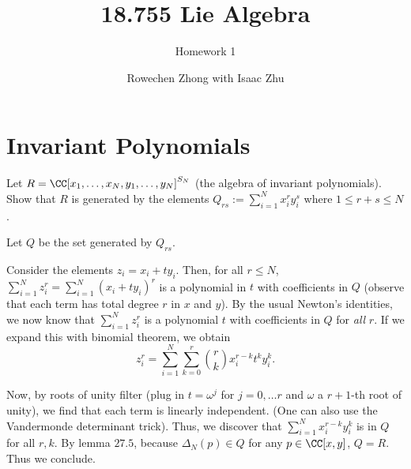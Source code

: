\documentclass[11pt, headheight=30pt]{scrartcl}
\title{18.755 Lie Algebra}
\subtitle{Homework 1}
\author{Rowechen Zhong with Isaac Zhu}
\begin{document}
\section{Invariant Polynomials}
\begin{prob*}
    Let $R = \CC[x_1, \ldots, x_N, y_1, \ldots, y_N]^{S_N}$ (the algebra of invariant polynomials). Show that $R$ is generated by the elements $Q_{rs} := \sum_{i=1}^N x_i^r y_i^s$ where $1 \leq r + s \leq N$.
\end{prob*}

Let $Q$ be the set generated by $Q_{rs}$.

Consider the elements $z_i = x_i + t y_i$. Then, for all $r \leq N$, $\sum_{i = 1}^N z_i^r = \sum_{i = 1}^N (x_i + t y_i)^r$ is a polynomial in $t$ with coefficients in $Q$ (observe that each term has total degree $r$ in $x$ and $y$). By the usual Newton's identities, we now know that $\sum_{i = 1}^N z_i^r$ is a polynomial $t$ with coefficients in $Q$ for \emph{all} $r$. If we expand this with binomial theorem, we obtain
\[
    z_i^r = \sum_{i = 1}^N \sum_{k = 0}^r \binom{r}{k} x_i^{r-k} t^k y_i^k.    
\]

Now, by roots of unity filter (plug in $t = \omega^j$ for $j = 0,\dots r$ and $\omega$ a $r+1$-th root of unity), we find that each term is linearly independent. (One can also use the Vandermonde determinant trick). Thus, we discover that $\sum_{i = 1}^N x_i^{r-k} y_i^k$ is in $Q$ for all $r,k$. By lemma $27.5$, because $\Delta_N(p)\in Q$ for any $p\in \CC[x,y]$, $Q = R$. Thus we conclude.
\end{document}

